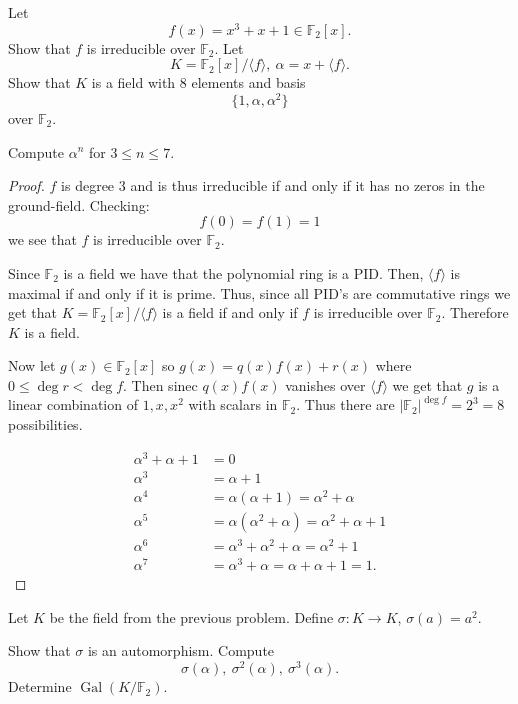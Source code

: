 \begin{prob}
    Let 
    \[
        f(x) = x^3 + x + 1 \in \mathbb F_2[x].
    \]
    Show that $f$ is irreducible over $\mathbb F_2$. 
    Let 
    \[
        K = \mathbb F_2[x]/\langle f \rangle, \ 
        \alpha = x + \langle f \rangle. 
    \]
    Show that $K$ is a field with $8$ elements and 
    basis 
    \[
        \{1, \alpha, \alpha^2\} 
    \]
    over $\mathbb F_2$.

    Compute $\alpha^n$ for $3 \leq n \leq 7$.
\end{prob}
\begin{proof}
    $f$ is degree $3$ and is thus irreducible if and 
    only if it has no zeros in the ground-field. Checking: 
    \[
        f(0) = f(1) = 1
    \]
    we see that $f$ is irreducible over $\mathbb F_2$.

    Since $\mathbb F_2$ is a field we have that 
    the polynomial ring is a PID. Then, 
    $\langle f \rangle$ is maximal if and 
    only if it is prime. Thus, since all PID's 
    are commutative rings we get that 
    $K = \mathbb F_2[x]/\langle f \rangle$ is 
    a field if and only if $f$ is irreducible over 
    $\mathbb F_2$. Therefore $K$ is a field. 

    Now let $g(x) \in \mathbb F_2[x]$ so 
    $g(x) = q(x)f(x) + r(x)$ where 
    $0 \leq \deg r < \deg f$. 
    Then sinec $q(x)f(x)$ vanishes 
    over $\langle f \rangle$ we get that 
    $g$ is a linear combination of 
    $1,x,x^2$ with scalars in $\mathbb F_2$. 
    Thus there are $|\mathbb F_2|^{\deg f} = 2^3 = 8$ possibilities. 

    \begin{align*}
        \alpha^3 + \alpha + 1 
        &= 0 \\ 
        \alpha^3 
        &= \alpha + 1 \\ 
        \alpha^4 &= \alpha(\alpha + 1) = \alpha^2 + \alpha \\ 
        \alpha^5 &= \alpha(\alpha^2 + \alpha) = \alpha^2 + \alpha + 1 \\ 
        \alpha^6 &= \alpha^3 + \alpha^2 + \alpha = \alpha^2 + 1 \\ 
        \alpha^7 &= \alpha^3 + \alpha = \alpha + \alpha + 1 = 1.
    \end{align*}
\end{proof}

\begin{prob}
    Let $K$ be the field from the previous problem.
    Define $\sigma : K \to K$, $\sigma(a) = a^2$.

    Show that $\sigma$ is an automorphism. 
    Compute 
    \[
        \sigma(\alpha), \ \sigma^2(\alpha), \ \sigma^3(\alpha).
    \]
    Determine $\operatorname{Gal}(K/\mathbb F_2)$.
\end{prob}

